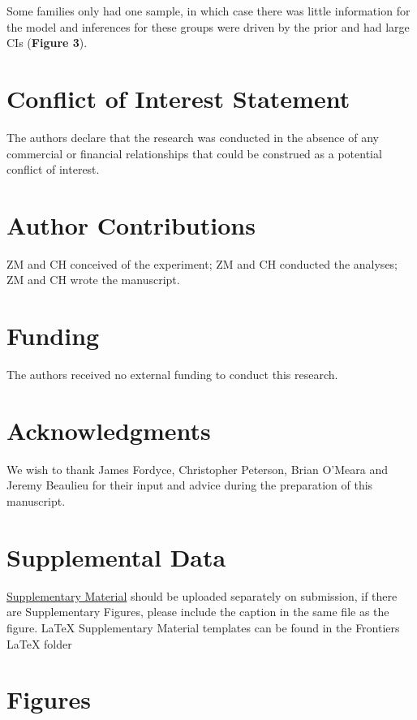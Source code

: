 \documentclass{frontiersSCNS}
\begin{document}
Some families only had one sample, in which case there was little information for the model and inferences for these groups were driven by the prior and had large CIs (\textbf{Figure 3}).

\newpage


\section*{Conflict of Interest Statement}
The authors declare that the research was conducted in the absence of any commercial or financial relationships that could be construed as a potential conflict of interest.


\section*{Author Contributions}
ZM and CH conceived of the experiment; ZM and CH conducted the analyses; ZM and CH wrote the manuscript. 

\section*{Funding}
The authors received no external funding to conduct this research.

\section*{Acknowledgments}
We wish to thank James Fordyce, Christopher Peterson, Brian O'Meara and Jeremy Beaulieu for their input and advice during the preparation of this manuscript.

\section*{Supplemental Data}
 \href{http://home.frontiersin.org/about/author-guidelines#SupplementaryMaterial}{Supplementary Material} should be uploaded separately on submission, if there are Supplementary Figures, please include the caption in the same file as the figure. LaTeX Supplementary Material templates can be found in the Frontiers LaTeX folder 
\newpage
 

\newpage 


\section*{Figures}
\end{document}
